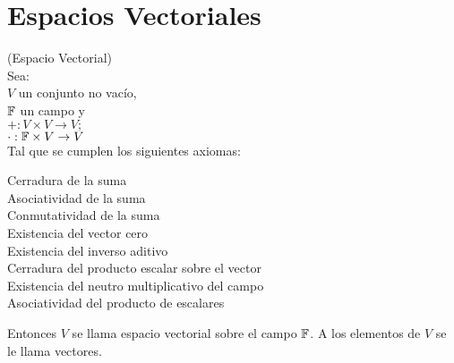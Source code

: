 \section{Espacios Vectoriales}
\begin{defin}
	(Espacio Vectorial)\\
Sea: \\
$V$ un conjunto no vac\'{i}o,\\ $\mathbb{F}$ un campo y \\  $+: V\times V \to V;$ \\$ \cdot : \mathbb{F}\times V \to V$ \\
Tal que se cumplen los siguientes axiomas:

\begin{description}
	\item[Cerradura de la suma]
\item[Asociatividad de la suma]
\item[Conmutatividad de la suma]
\item[Existencia del vector cero]
\item[Existencia del inverso aditivo]
\item[Cerradura del producto escalar sobre el vector]
\item[Existencia del neutro multiplicativo del campo]
\item[Asociatividad del producto de escalares]
\end{description}

Entonces $V$ se llama espacio vectorial sobre el campo $\mathbb{F}$. A los elementos de $V$ se le llama vectores.

\end{defin}


%
%
